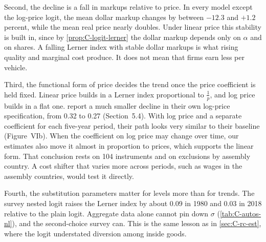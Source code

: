 Second, the decline is a fall in markups relative to price. In every model except the log-price logit, the mean dollar
markup changes by between $-12.3$ and $+1.2$ percent, while the mean real price nearly doubles. Under linear price this
stability is built in, since by \cref{prop:C-logit-lerner} the dollar markup depends only on $\alpha$ and on shares. A
falling Lerner index with stable dollar markups is what rising quality and marginal cost produce. It does not mean that
firms earn less per vehicle.

Third, the functional form of price decides the trend once the price coefficient is held fixed. Linear price builds in
a Lerner index proportional to $\frac{1}{p}$, and log price builds in a flat one. \citet{GriecoMurryYurukoglu2024}
report a much smaller decline in their own log-price specification, from 0.32 to 0.27 (Section~5.4). With log price
and a separate coefficient for each five-year period, their path looks very similar to their baseline (Figure~VIb).
When the coefficient on log price may change over time, our estimates also move it almost in proportion to prices,
which supports the linear form. That conclusion rests on 104 instruments and on exclusions by assembly country. A cost shifter
that varies more across periods, such as wages in the assembly countries, would test it directly.

Fourth, the substitution parameters matter for levels more than for trends. The survey nested logit raises the Lerner
index by about 0.09 in 1980 and 0.03 in 2018 relative to the plain logit. Aggregate data alone cannot pin down $\sigma$
(\cref{tab:C-autos-nl}), and the second-choice survey can. This is the same lesson as in \cref{sec:C-rc-est}, where the
logit understated diversion among inside goods.

